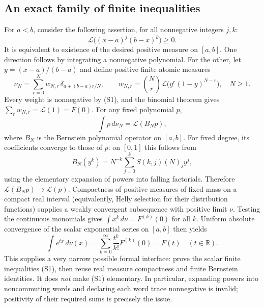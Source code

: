 \documentclass[11pt,a4paper]{article}
\newcommand{\R}{\mathbb R}
\begin{document}
\subsection{An exact family of finite inequalities}
For $a<b$, consider the following assertion, for all nonnegative integers
$j,k$:
\begin{equation}\label{eq:bmv-finite-core}
 \mathcal L\bigl((x-a)^j(b-x)^k\bigr)\ge0. \tag{S1}
\end{equation}
It is equivalent to existence of the desired positive measure on $[a,b]$.
One direction follows by integrating a nonnegative polynomial. For the
other, let $y=(x-a)/(b-a)$ and define positive finite atomic measures
\[
 \nu_N=\sum_{r=0}^N w_{N,r}\,\delta_{a+(b-a)r/N},\qquad
 w_{N,r}=\binom Nr\mathcal L\bigl(y^r(1-y)^{N-r}\bigr),\quad N\ge1.
\]
Every weight is nonnegative by (S1), and the binomial theorem gives
$\sum_rw_{N,r}=\mathcal L(1)=F(0)$. For any fixed polynomial $p$,
\[
 \int p\,d\nu_N=\mathcal L(B_Np),
\]
where $B_N$ is the Bernstein polynomial operator on $[a,b]$.
For fixed degree, its coefficients converge to those of $p$: on $[0,1]$
this follows from
\[
 B_N(y^k)=N^{-k}\sum_{j=0}^k S(k,j)(N)_j y^j,
\]
using the elementary expansion of powers into falling factorials.
Therefore $\mathcal L(B_Np)\to\mathcal L(p)$.
Compactness of positive measures of fixed mass on a compact real interval
(equivalently, Helly selection for their distribution functions) supplies
a weakly convergent subsequence with positive limit $\nu$.
Testing the continuous monomials gives
$\int x^k\,d\nu=F^{(k)}(0)$ for all $k$.
Uniform absolute convergence of the scalar exponential series on $[a,b]$
then yields
\[
 \int e^{tx}\,d\nu(x)
 =\sum_{k=0}^\infty\frac{t^k}{k!}F^{(k)}(0)=F(t)
 \quad(t\in\R).
\]
This supplies a very narrow possible formal interface: prove the scalar
finite inequalities (S1), then reuse real measure compactness and finite
Bernstein identities. It does \emph{not} make (S1) elementary. In
particular, expanding powers into noncommuting words and declaring each
word trace nonnegative is invalid; positivity of their required sums is
precisely the issue.
\end{document}

